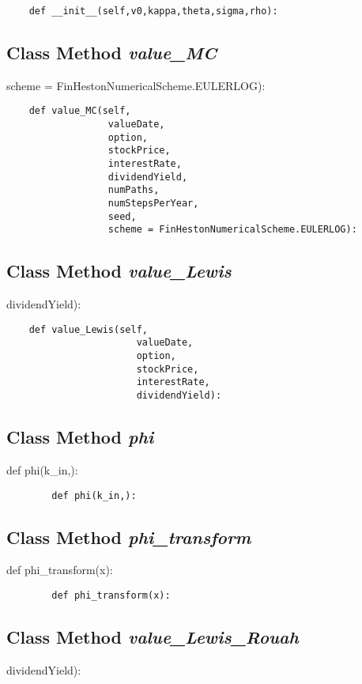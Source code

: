 \documentclass[twoside,11pt]{book}
\begin{document}
\begin{lstlisting}
    def __init__(self,v0,kappa,theta,sigma,rho):
\end{lstlisting}

\subsection{Class Method {\it value\_MC}}
scheme = FinHestonNumericalScheme.EULERLOG):

\begin{lstlisting}
    def value_MC(self,
                  valueDate,
                  option,
                  stockPrice,
                  interestRate,
                  dividendYield,
                  numPaths,
                  numStepsPerYear,
                  seed, 
                  scheme = FinHestonNumericalScheme.EULERLOG):
\end{lstlisting}

\subsection{Class Method {\it value\_Lewis}}
dividendYield):

\begin{lstlisting}
    def value_Lewis(self,
                       valueDate,
                       option,
                       stockPrice,
                       interestRate,
                       dividendYield):
\end{lstlisting}

\subsection{Class Method {\it phi}}
def phi(k\_in,):

\begin{lstlisting}
        def phi(k_in,):
\end{lstlisting}

\subsection{Class Method {\it phi\_transform}}
def phi\_transform(x):

\begin{lstlisting}
        def phi_transform(x):
\end{lstlisting}

\subsection{Class Method {\it value\_Lewis\_Rouah}}
dividendYield):
\end{document}
